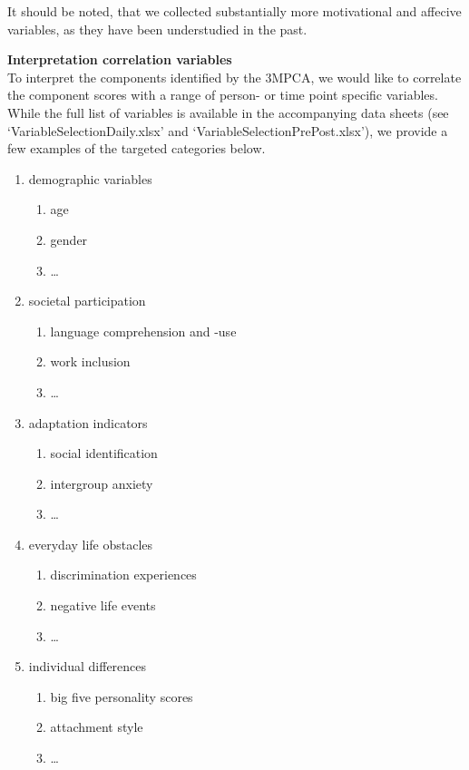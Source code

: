 \documentclass[]{article}
\providecommand{\tightlist}{%
\setlength{\itemsep}{0pt}\setlength{\parskip}{0pt}}
\begin{document}
It should be noted, that we collected substantially more motivational
and affecive variables, as they have been understudied in the past.

\textbf{Interpretation correlation variables}\\
To interpret the  components identified by the 3MPCA,
we would like to correlate the component scores with a range of person-
or time point specific variables. While the full list of variables is
available in the accompanying data sheets (see
`VariableSelectionDaily.xlsx' and `VariableSelectionPrePost.xlsx'), we
provide a few examples of the targeted categories below.

\begin{enumerate}
\def\labelenumi{\arabic{enumi}.}
\tightlist
\item
  demographic variables

  \begin{enumerate}
  \def\labelenumii{\alph{enumii}.}
  \tightlist
  \item
    age
  \item
    gender
  \item
    \ldots{}
  \end{enumerate}
\item
  societal participation

  \begin{enumerate}
  \def\labelenumii{\alph{enumii}.}
  \tightlist
  \item
    language comprehension and -use
  \item
    work inclusion
  \item
    \ldots{}
  \end{enumerate}
\item
  adaptation indicators

  \begin{enumerate}
  \def\labelenumii{\alph{enumii}.}
  \tightlist
  \item
    social identification
  \item
    intergroup anxiety
  \item
    \ldots{}
  \end{enumerate}
\item
  everyday life obstacles

  \begin{enumerate}
  \def\labelenumii{\alph{enumii}.}
  \tightlist
  \item
    discrimination experiences
  \item
    negative life events
  \item
    \ldots{}
  \end{enumerate}
\item
  individual differences

  \begin{enumerate}
  \def\labelenumii{\alph{enumii}.}
  \tightlist
  \item
    big five personality scores
  \item
    attachment style
  \item
    \ldots{}
  \end{enumerate}
\end{enumerate}
\end{document}
